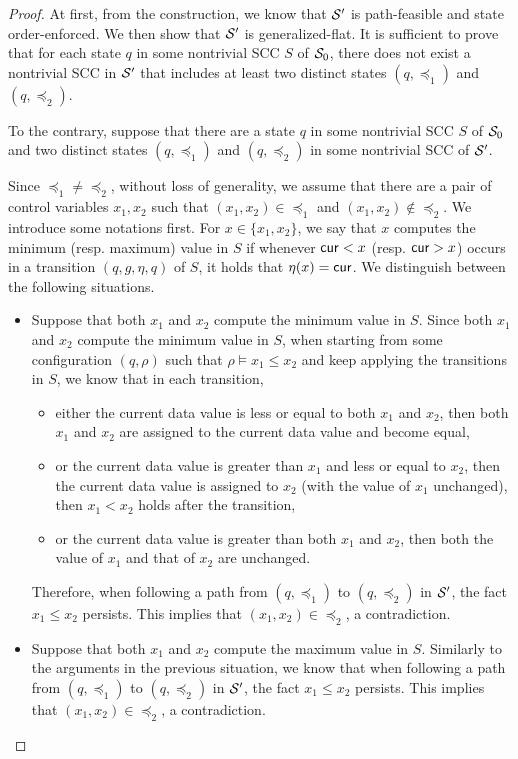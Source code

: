 \begin{appendix}
\begin{proof}
At first, from the construction, we know that ${\mathcal{S} }'$ is path-feasible and state order-enforced. We then show that ${\mathcal{S} }'$ is generalized-flat. It is sufficient to prove that for each state $q$ in some nontrivial SCC $S$ of ${\mathcal{S} }_0$, there does not exist a nontrivial SCC in ${\mathcal{S} }'$ that includes at least two distinct states $(q, \preceq_1)$ and $(q, \preceq_2)$.

To the contrary, suppose that there are a state $q$ in some nontrivial SCC $S$ of ${\mathcal{S} }_0$ and two distinct states $(q, \preceq_1)$ and $(q, \preceq_2)$ in some nontrivial SCC of ${\mathcal{S} }'$.

Since $\preceq_1 \neq \preceq_2$, without loss of generality, we assume that there are a pair of control variables $x_1,x_2$ such that $(x_1, x_2) \in \preceq_1$ and $(x_1, x_2) \not \in \preceq_2$. 
We introduce some notations first. For $x \in \{x_1, x_2\}$, we say that $x$ computes the minimum (resp. maximum) value in $S$ if whenever $\mathsf{cur} < x$ (resp. $\mathsf{cur} > x$) occurs in a transition $(q, g, \eta, q)$ of $S$, it holds that $\eta(x)=\mathsf{cur}$. 
We distinguish between the following situations.
\begin{itemize}
\item Suppose that both $x_1$ and $x_2$ compute the minimum value in $S$. Since both $x_1$ and $x_2$ compute the minimum value in $S$, when starting from some configuration $(q, \rho)$ such that $\rho \models x_1 \le x_2$ and keep applying the transitions in $S$, we know that in each transition, 
\begin{itemize}
\item either the current data value is less or equal to both $x_1$ and $x_2$, then both $x_1$ and $x_2$ are assigned to the current data value and become equal, 
%
\item or the current data value is greater than $x_1$ and less or equal to $x_2$, then the current data value is assigned to $x_2$ (with the value of $x_1$ unchanged), then $x_1 < x_2$ holds after the transition,
%
\item or the current data value is greater than both $x_1$ and $x_2$, then both the value of $x_1$ and that of $x_2$ are unchanged.
\end{itemize}
Therefore, when following a path from $(q, \preceq_1)$ to $(q, \preceq_2)$ in ${\mathcal{S} }'$, the fact $x_1 \le x_2$ persists. This implies that $(x_1, x_2) \in \preceq_2$, a contradiction.
%
\item Suppose that both $x_1$ and $x_2$ compute the maximum value in $S$. Similarly to the arguments in the previous situation, we know that when following a path from $(q, \preceq_1)$ to $(q, \preceq_2)$ in ${\mathcal{S} }'$, the fact $x_1 \le x_2$ persists. This implies that $(x_1, x_2) \in \preceq_2$, a contradiction.

\end{itemize}
\end{proof}
\end{appendix}
